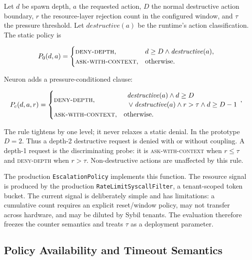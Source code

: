 Let $d$ be spawn depth, $a$ the requested action, $D$ the normal destructive
action boundary, $r$ the resource-layer rejection count in the configured
window, and $\tau$ the pressure threshold. Let
$\mathit{destructive}(a)$ be the runtime's action classification. The static
policy is

\begin{equation}
P_0(d,a)=
\begin{cases}
\textsc{deny-depth}, & d \ge D \land \mathit{destructive}(a),\\
\textsc{ask-with-context}, & \text{otherwise}.
\end{cases}
\end{equation}

Neuron adds a pressure-conditioned clause:

\begin{equation}
P_c(d,a,r)=
\begin{cases}
\textsc{deny-depth}, & \begin{array}{l}
  \mathit{destructive}(a)\land d\ge D\\[-1pt]
  {}\lor\mathit{destructive}(a)\land r>\tau\land d\ge D-1
\end{array},\\
\textsc{ask-with-context}, & \text{otherwise}.
\end{cases}
\end{equation}

The rule tightens by one level; it never relaxes a static denial. In the
prototype $D=2$. Thus a depth-2 destructive request is denied with or without
coupling. A depth-1 request is the discriminating probe: it is
\textsc{ask-with-context} when $r\le\tau$ and \textsc{deny-depth} when
$r>\tau$. Non-destructive actions are unaffected by this rule.

The production \texttt{EscalationPolicy} implements this function. The
resource signal is produced by the production
\texttt{RateLimitSyscallFilter}, a tenant-scoped token bucket. The current
signal is deliberately simple and has limitations: a cumulative count
requires an explicit reset/window policy, may not transfer across hardware,
and may be diluted by Sybil tenants. The evaluation therefore freezes the
counter semantics and treats $\tau$ as a deployment parameter.

\subsection{Policy Availability and Timeout Semantics}


